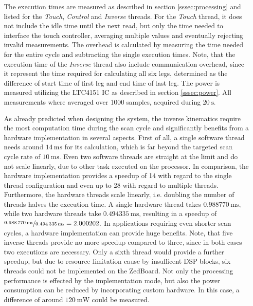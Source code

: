 The execution times are measured as described in section
\ref{sssec:processing} and listed for the \emph{Touch}, \emph{Control} and
\emph{Inverse} threads. For the \emph{Touch} thread, it does not include the
idle time until the next read, but only the time needed to interface the touch
controller, averaging multiple values and eventually rejecting invalid
measurements. The overhead is calculated by measuring the time needed for the
entire cycle and subtracting the single execution times. Note, that the
execution time of the \emph{Inverse} thread also include communication
overhead, since it represent the time required for calculating all six legs,
determined as the difference of start time of first leg and end time of last
leg. The power is measured utilizing the LTC4151 \ac{IC} as described in
section \ref{sssec:power}. All measurements where averaged over 1000 samples,
acquired during $\SI{20}{\second}$.

As already predicted when designing the system, the inverse kinematics require
the most computation time during the scan cycle and significantly benefits
from a hardware implementation in several aspects. First of all, a single
software thread needs around $\SI{14}{\milli\second}$ for its calculation,
which is far beyond the targeted scan cycle rate of $\SI{10}{\milli\second}$.
Even two software threads are straight at the limit and do not scale linearly,
due to other task executed on the processor. In comparison, the hardware
implementation provides a speedup of 14 with regard to the single thread
configuration and even up to 28 with regard to multiple threads. Furthermore,
the hardware threads scale linearly, i.e. doubling the number of threads
halves the execution time. A single hardware thread takes
$\SI{0.988770}{\milli\second}$, while two hardware threads take
$\SI{0.494335}{\milli\second}$, resulting in a speedup of $\nicefrac{\SI{0.988
770}{\milli\second}}{\SI{0.494335}{\milli\second}}=2.000202$. In applications
requiring even shorter scan cycles, a hardware implementation can provide huge
benefits. Note, that five inverse threads provide no more speedup compared to
three, since in both cases two executions are necessary. Only a sixth thread
would provide a further speedup, but due to resource limitation cause by
insufficent \ac{DSP} blocks, six threads could not be implemented on the
ZedBoard. Not only the processing performance is effected by the
implementation mode, but also the power consumption can be reduced by
incorporating custom hardware. In this case, a difference of around
$\SI{120}{\milli\watt}$ could be measured.

